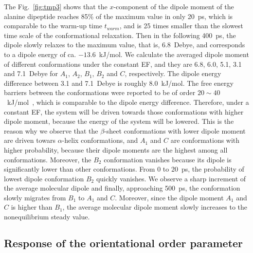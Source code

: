 \documentclass[a4paper,preprint,unsortedaddress,onecolumn]{revtex4-1}
\begin{document}
The Fig.~\ref{fig:tmp3}
shows that the $x$-component of the dipole moment of the alanine dipeptide
reaches 85\% of the maximum value in only 20~ps, which is comparable to
the warm-up time $t_{warm}$, and is 25 times
smaller than the slowest time scale of the conformational relaxation.
Then in the following 400~ps, the dipole slowly relaxes to the 
maximum value, that is, 
6.8~Debye, and  corresponds to a dipole energy of ca. $-13.6$~kJ/mol.
We calculate the averaged dipole moment of different conformations
under the constant EF, and they are 6.8, 6.0, 5.1, 3.1 and 7.1~Debye
for $A_1$, $A_2$, $B_1$, $B_2$ and $C$, respectively.
The dipole energy difference between 3.1 and 7.1~Debye is roughly 8.0~kJ/mol.
The free energy barriers between the
conformations were reported to be of order $20\sim 40$~kJ/mol~\cite{bohner2012algorithm},
which is comparable to the dipole energy difference. 
Therefore, under a constant EF, the system will be driven towards those
conformations with higher dipole moment, because the
energy of the system will be lowered.  This is the reason why
we observe that the $\beta$-sheet conformations with lower dipole moment
are driven towars $\alpha$-helix conformations, 
and $A_1$ and $C$ are conformations with higher probability, because their dipole moments are the highest
among all conformations. Moreover, the $B_2$ conformation vanishes because
its dipole is significantly lower than other conformations.
From 0 to 20~ps, the probability of
lowest dipole conformation $B_2$ quickly
vanishes. We observe a sharp increment of the average molecular dipole and finally, approaching  500~ps, the conformation slowly migrates from
$B_1$ to $A_1$ and $C$. Moreover, since the dipole moment $A_1$ and $C$
is higher than $B_1$, the average molecular dipole moment slowly increases
to the nonequilibrium steady value.
\subsection{Response of the orientational order parameter}
\end{document}
